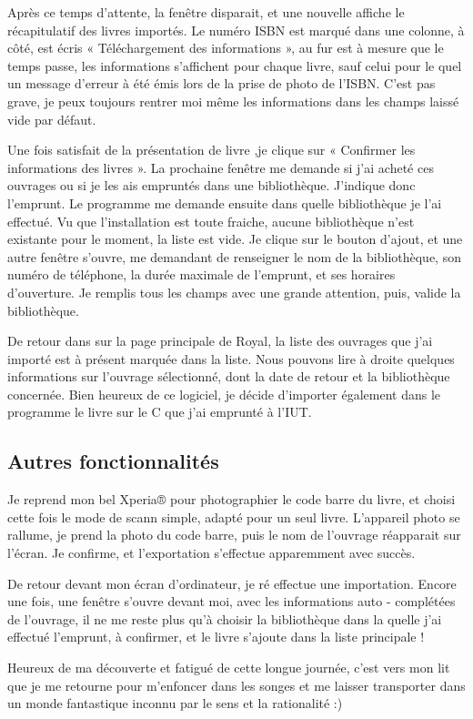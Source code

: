 Après ce temps d'attente, la fenêtre disparait, et une nouvelle affiche le récapitulatif des livres importés.
Le numéro ISBN est marqué dans une colonne, à côté, est écris « Téléchargement des informations », au fur est à mesure que le temps passe, les informations s'affichent pour chaque livre, sauf celui pour le quel un message d'erreur à été émis lors de la prise de photo de l'ISBN. 
C'est pas grave, je peux toujours rentrer moi même les informations dans les champs laissé vide par défaut. 

Une fois satisfait de la présentation de livre ,je clique sur « Confirmer les informations des livres ». 
La prochaine fenêtre me demande si j'ai acheté ces ouvrages ou si je les ais empruntés dans une bibliothèque. 
J'indique donc l'emprunt.
Le programme me demande ensuite dans quelle bibliothèque je l'ai effectué. 
Vu que l'installation est toute fraiche, aucune bibliothèque n'est existante pour le moment, la liste est vide.
Je clique sur le bouton d'ajout, et une autre fenêtre s'ouvre, me demandant de renseigner le nom de la bibliothèque, son numéro de téléphone, la durée maximale de l'emprunt, et ses horaires d'ouverture. 
Je remplis tous les champs avec une grande attention, puis, valide la bibliothèque. 

De retour dans sur la page principale de Royal, la liste des ouvrages que j'ai importé est à présent marquée dans la liste. 
Nous pouvons lire à droite quelques informations sur l'ouvrage sélectionné, dont la date de retour et la bibliothèque concernée. 
Bien heureux de ce logiciel, je décide d'importer également dans le programme le livre sur le C que j'ai emprunté à l'IUT. 

\subsection {Autres fonctionnalités}

Je reprend mon bel Xperia® pour photographier le code barre du livre, et choisi cette fois le mode de scann simple, adapté pour un seul livre. 
L'appareil photo se rallume, je prend la photo du code barre, puis le nom de l'ouvrage réapparait sur l'écran.
Je confirme, et l'exportation s'effectue apparemment avec succès. 

De retour devant mon écran d'ordinateur, je ré effectue une importation. 
Encore une fois, une fenêtre s'ouvre devant moi, avec les informations auto - complétées de l'ouvrage, il ne me reste plus qu'à choisir la bibliothèque dans la quelle j'ai effectué l'emprunt, à confirmer, et le livre s'ajoute dans la liste principale !

Heureux de ma découverte et fatigué de cette longue journée, c'est vers mon lit que je me retourne pour m'enfoncer dans les songes et me laisser transporter dans un monde fantastique inconnu par le sens et la rationalité :) 


